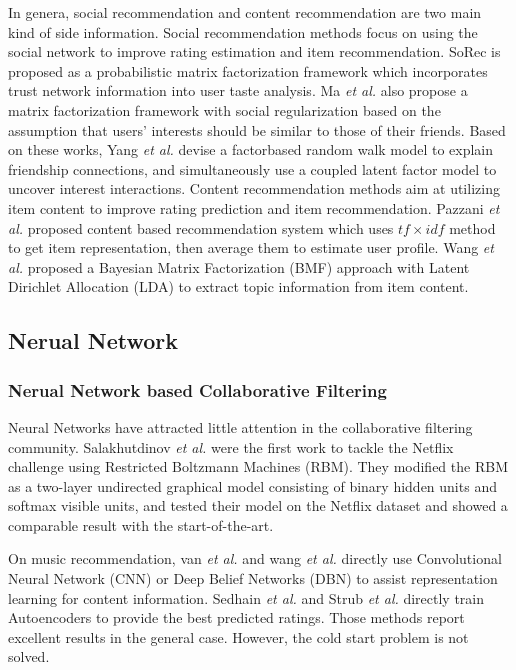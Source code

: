 \documentclass{sig-alternate-05-2015}
\begin{document}
In genera, social recommendation and content recommendation
are two main kind of side information.
Social recommendation methods focus on using the social network
to improve rating estimation and item recommendation.
SoRec \cite{ma2008sorec} is proposed as a probabilistic matrix
factorization framework which incorporates trust network information
into user taste analysis.
Ma \textit{et al.} \cite{ma2011recommender} also propose a matrix factorization framework
with social regularization based on the assumption
that users’ interests should be similar to those of their friends.
Based on these works, Yang \textit{et al.} \cite{yang2011like}
devise a factorbased random walk model to explain friendship connections,
and simultaneously use a coupled latent factor model to uncover interest interactions.
Content recommendation methods aim at utilizing item content
to improve rating prediction and item recommendation.
Pazzani \textit{et al.} \cite{pazzani2007content}
proposed content based recommendation system
which uses $tf \times idf$ method to get item representation,
then average them to estimate user profile.
Wang \textit{et al.} \cite{wang2011collaborative}
proposed a Bayesian Matrix Factorization (BMF) approach
with Latent Dirichlet Allocation (LDA) to extract topic
information from item content.

\subsection{Nerual Network}
\subsubsection{Nerual Network based Collaborative Filtering}
Neural Networks have attracted little attention in the
collaborative filtering community.
Salakhutdinov \textit{et al.} \cite{salakhutdinov2007restricted} were the first
work to tackle the Netflix challenge using Restricted Boltzmann Machines (RBM).
They modified the RBM as a two-layer undirected graphical model
consisting of binary hidden units and softmax visible units,
and tested their model on the Netflix dataset and
showed a comparable result with the start-of-the-art.

On music recommendation, van \textit{et al.} \cite{van2013deep}
and wang \textit{et al.} \cite{wang2014improving}
directly use Convolutional Neural Network (CNN)
or Deep Belief Networks (DBN)
to assist representation learning for content information.
Sedhain \textit{et al.} \cite{sedhain2015autorec} and
Strub \textit{et al.} \cite{strub2015collaborative}
directly train Autoencoders to provide the best predicted ratings.
Those methods report excellent results in the general case.
However, the cold start problem is not solved.
\end{document}
